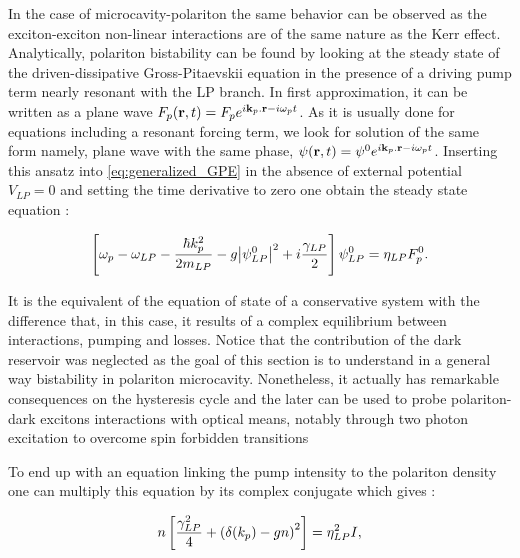 In the case of microcavity-polariton the same behavior can be observed as the exciton-exciton non-linear interactions are of the same nature as the Kerr effect.
Analytically, polariton bistability can be found by looking at the steady state of the driven-dissipative Gross-Pitaevskii equation in the presence of a driving pump term nearly resonant with the LP branch. In first approximation, it can be written as a plane wave $F_p(\mathbf{r},t)=F_p e^{i\mathbf{k}_p.\mathbf{r}-i\omega_p t}$.
As it is usually done for equations including a resonant forcing term, we look for solution of the same form namely, plane wave with the same phase, $\psi(\mathbf{r},t)= \psi^0e^{i\mathbf{k}_p.\mathbf{r}-i\omega_p t}$.
Inserting this ansatz into \autoref{eq:generalized_GPE} in the absence of external potential $V_{LP}=0$ and setting the time derivative to zero one obtain the steady state equation :

\begin{equation}
    \left[\omega_p -\omega_{LP} - \dfrac{\hbar k_p^2}{2 m_{LP}} - g \abs{\psi_{LP}^0}^2 + i \dfrac{\gamma_{LP}}{2} \right] \psi_{LP}^0= \eta_{LP} F_p^0.
    \label{eq:steady_state}
\end{equation}

It is the equivalent of the equation of state of a conservative system with the difference that, in this case, it results of a complex equilibrium between interactions, pumping and losses. Notice that 
the contribution of the dark reservoir was neglected as the goal of this section is to understand in a general way bistability in polariton microcavity. Nonetheless, it 
actually has remarkable consequences on the hysteresis cycle and the later can be used to probe polariton-dark excitons interactions with optical means, notably through two photon excitation to overcome spin forbidden transitions \cite{dark_exciton_pol_interactions}

To end up with an equation linking the pump intensity to the polariton density one can multiply this equation by its complex conjugate which gives :

\begin{equation}
    n \left[ \dfrac{\gamma_{LP}^2}{4} + \left(\delta(k_p) - g n \right)^2 \right] =  \eta_{LP}^2 I,
\label{eq:eq_of_state}
\end{equation}

